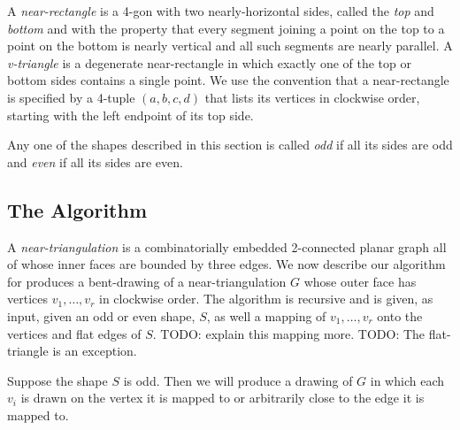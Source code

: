 \documentclass{patmorin}
\begin{document}
A \emph{near-rectangle} is a 4-gon with two nearly-horizontal sides,
called the \emph{top} and \emph{bottom} and with the property that every
segment joining a point on the top to a point on the bottom is nearly
vertical and all such segments are nearly parallel.  A \emph{v-triangle}
is a degenerate near-rectangle in which exactly one of the top or bottom
sides contains a single point.  We use the convention that a near-rectangle is specified by a 4-tuple $(a,b,c,d)$ that lists its vertices in clockwise order, starting with the left endpoint of its top side.

%
%
%
Any one of the shapes described in this section is called \emph{odd}
if all its sides are odd and \emph{even} if all its sides are even.

\subsection{The Algorithm}

A \emph{near-triangulation} is a combinatorially embedded 2-connected planar
graph all of whose inner faces are bounded by three edges.
We now describe our algorithm for produces a bent-drawing of a
near-triangulation $G$ whose outer face has vertices $v_1,\ldots,v_r$
in clockwise order.  The algorithm is recursive and is given, as input,
given an odd or even shape, $S$, as well a mapping of
$v_1,\ldots,v_r$ onto the vertices and flat edges of $S$.
TODO: explain this mapping more. TODO: The flat-triangle is an exception.

Suppose the shape $S$ is odd.  Then we will produce a drawing of $G$
in which each $v_i$ is drawn on the vertex it is mapped to or arbitrarily close to the edge it is mapped to.
\end{document}
